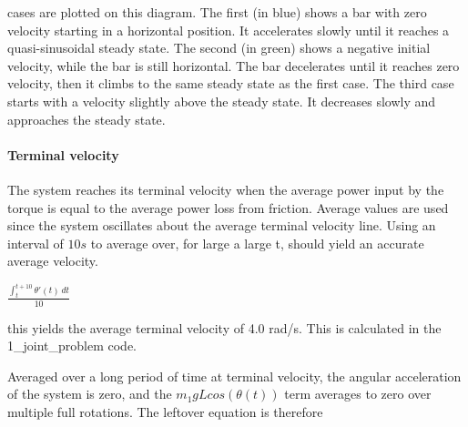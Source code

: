\documentclass{article}
\begin{document}
 cases are plotted on this diagram. The first (in blue) shows a bar with zero velocity starting in a horizontal position. It accelerates slowly until it reaches a quasi-sinusoidal steady state. The second (in green) shows a negative initial velocity, while the bar is still horizontal. The bar decelerates until it reaches zero velocity, then it climbs to the same steady state as the first case. The third case starts with a velocity slightly above the steady state. It decreases slowly and approaches the steady state.

\begin{center}
%
\label{labelname}%
\end{center}


\paragraph{Terminal velocity}
The system reaches its terminal velocity when the average power input by the torque is equal to the average power loss from friction. Average values are used since the system oscillates about the average terminal velocity line. Using an interval of $10s$ to average over, for large a large t, should yield an accurate average velocity.

\vspace{14pt}
$\frac{\int_{t}^{t + 10} \theta'(t) \, dt}{10}$
\vspace{14pt}

this yields the average terminal velocity of 4.0 rad/s. This is calculated in the 1\_joint\_problem code. 

Averaged over a long period of time at terminal velocity, the angular acceleration of the system is zero, and the $m_1gLcos(\theta(t))$ term averages to zero over multiple full rotations. The leftover equation is therefore
\end{document}

